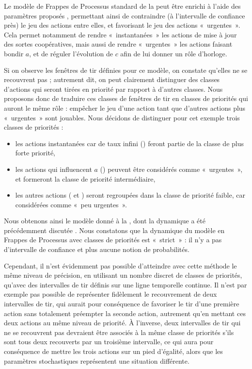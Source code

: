 \begin{example}
  Le modèle de Frappes de Processus standard de la 
  peut être enrichi à l'aide des paramètres proposés ,
  permettant ainsi
  de contraindre (à l'intervalle de confiance près) le jeu des actions entre elles,
  et favorisant le jeu des actions «~urgentes~».
  Cela permet notamment de rendre «~instantanées~»
  les actions de mise à jour des sortes coopératives,
  mais aussi de rendre «~urgentes~» les actions faisant bondir $a$,
  et de réguler l'évolution de $c$ afin de lui donner un rôle d'horloge.
  
  Si on observe les fenêtres de tir définies pour ce modèle, on constate qu'elles
  ne se recouvrent pas ; autrement dit, on peut clairement distinguer des classes
  d'actions qui seront tirées en priorité par rapport à d'autres classes.
  Nous proposons donc de traduire ces classes de fenêtres de tir en classes de priorités
  qui auront le même rôle : empêcher le jeu d'une action tant que d'autres actions
  plus «~urgentes~» sont jouables.
  Nous décidons de distinguer pour cet exemple trois classes de priorités :
  \begin{itemize}
    \item les actions instantanées car de taux infini (\stochainf) feront partie de la classe de
      plus forte priorité,
    \item les actions qui influencent $a$ (\stochaa) peuvent être considérés comme «~urgentes~»,
      et formeront la classe de priorité intermédiaire,
    \item les autres actions (\stochab{} et \stochac) seront regroupées dans la classe de priorité faible,
      car considérées comme «~peu urgentes~».
  \end{itemize}
  Nous obtenons ainsi le modèle donné à la ,
  dont la dynamique a été précédemment discutée .
  Nous constatons que la dynamique du modèle en Frappes de Processus avec classes de priorités
  est «~strict~» : il n'y a pas d'intervalle de confiance et plus aucune notion de probabilités.
\end{example}

\myskip

Cependant, il n'est évidemment pas possible d'atteindre
avec cette méthode le même niveau de précision, en utilisant un nombre
discret de classes de priorités,
qu'avec des intervalles de tir définis sur une ligne temporelle continue.
Il n'est par exemple
pas possible de représenter fidèlement le recouvrement de deux intervalles de tir,
qui aurait pour conséquence de favoriser le tir d'une première action sans totalement
préempter la seconde action,
autrement qu'en mettant ces deux actions au même niveau de priorité.
À l'inverse, deux intervalles de tir qui ne se recouvrent pas devraient être associés à la même
classe de priorités s'ils sont tous deux recouverts par un troisième intervalle,
ce qui aura pour conséquence de mettre les trois actions sur un pied d'égalité, alors que les
paramètres stochastiques représentent une situation différente.

